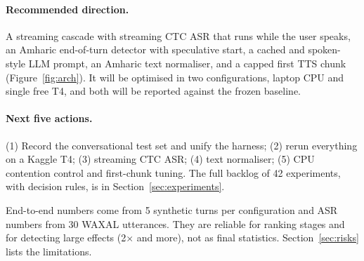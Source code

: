 \paragraph{Recommended direction.} A streaming cascade with streaming CTC ASR that runs while the user
speaks, an Amharic end-of-turn detector with speculative start, a cached and spoken-style LLM prompt, an
Amharic text normaliser, and a capped first TTS chunk (Figure~\ref{fig:arch}). It will be optimised in two
configurations, laptop CPU and single free T4, and both will be reported against the frozen baseline.

\paragraph{Next five actions.} (1) Record the conversational test set and unify the harness;
(2) rerun everything on a Kaggle T4; (3) streaming CTC ASR; (4) text normaliser; (5) CPU contention control
and first-chunk tuning. The full backlog of 42 experiments, with decision rules, is in
Section~\ref{sec:experiments}.

\begin{caveat}
End-to-end numbers come from 5 synthetic turns per configuration and ASR numbers from 30 WAXAL
utterances. They are reliable for ranking stages and for detecting large effects (2$\times$ and more), not
as final statistics. Section~\ref{sec:risks} lists the limitations.
\end{caveat}
\clearpage
